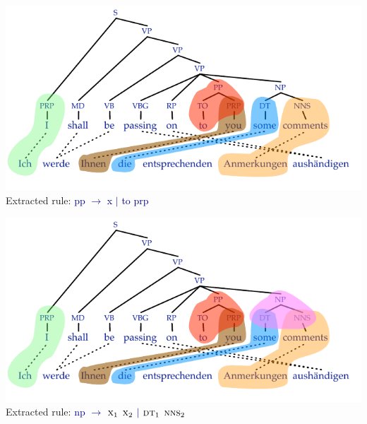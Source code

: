 \documentclass[landscape]{slides}
\newcommand{\example}[1]{\textcolor{darkblue}{\rm #1}}
\begin{document}

\vspace{5mm}
\begin{center}
\includegraphics[scale=2.1]{minimal-rules5.pdf}\\[-1mm]
Extracted rule: \example{{\sc pp} $\rightarrow$ {\sc x} $|$ to {\sc prp}}
\end{center}


\vspace{5mm}
\begin{center}
\includegraphics[scale=2.1]{minimal-rules6.pdf}\\[-1mm]
Extracted rule: \example{{\sc np} $\rightarrow$ $\text{\sc x}_1$ $\text{\sc x}_2$ $|$ $\text{\sc dt}_1$ $\text{\sc nns}_2$}
\end{center}

\end{document}
